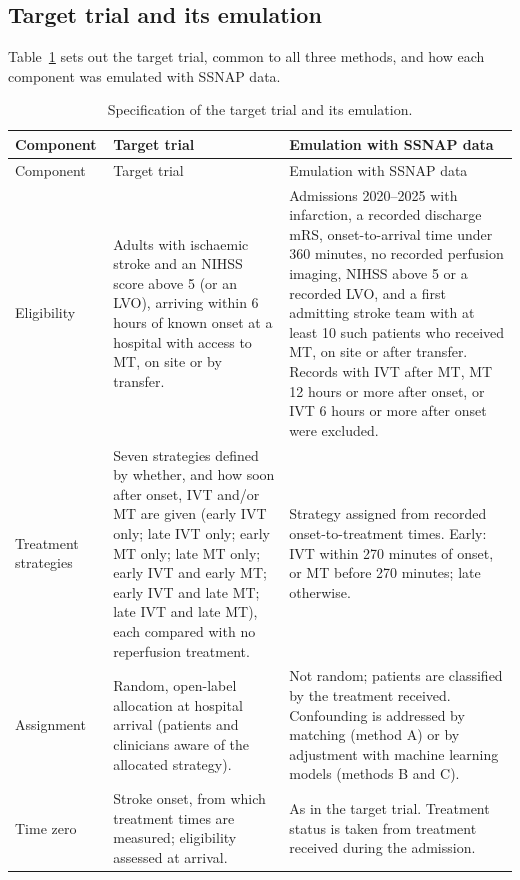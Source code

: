 \subsection{Target trial and its emulation}

Table~\ref{tab:protocol_target} sets out the target trial, common to all three methods, and how each component was emulated with SSNAP data.

{\small
\begin{longtable}[]{@{}p{}p{}p{}@{}}
\caption{Specification of the target trial and its emulation.}\label{tab:protocol_target}\\
\toprule
Component & Target trial & Emulation with SSNAP data \\
\midrule
\endfirsthead
\toprule
Component & Target trial & Emulation with SSNAP data \\
\midrule
\endhead
\bottomrule
\endlastfoot
Eligibility & Adults with ischaemic stroke and an NIHSS score above 5 (or an LVO), arriving within 6 hours of known onset at a hospital with access to MT, on site or by transfer. & Admissions 2020--2025 with infarction, a recorded discharge mRS, onset-to-arrival time under 360 minutes, no recorded perfusion imaging, NIHSS above 5 or a recorded LVO, and a first admitting stroke team with at least 10 such patients who received MT, on site or after transfer. Records with IVT after MT, MT 12 hours or more after onset, or IVT 6 hours or more after onset were excluded. \\
\addlinespace
Treatment strategies & Seven strategies defined by whether, and how soon after onset, IVT and/or MT are given (early IVT only; late IVT only; early MT only; late MT only; early IVT and early MT; early IVT and late MT; late IVT and late MT), each compared with no reperfusion treatment. & Strategy assigned from recorded onset-to-treatment times. Early: IVT within 270 minutes of onset, or MT before 270 minutes; late otherwise. \\
\addlinespace
Assignment & Random, open-label allocation at hospital arrival (patients and clinicians aware of the allocated strategy). & Not random; patients are classified by the treatment received. Confounding is addressed by matching (method A) or by adjustment with machine learning models (methods B and C). \\
\addlinespace
Time zero & Stroke onset, from which treatment times are measured; eligibility assessed at arrival. & As in the target trial. Treatment status is taken from treatment received during the admission. \\

\end{longtable}}
